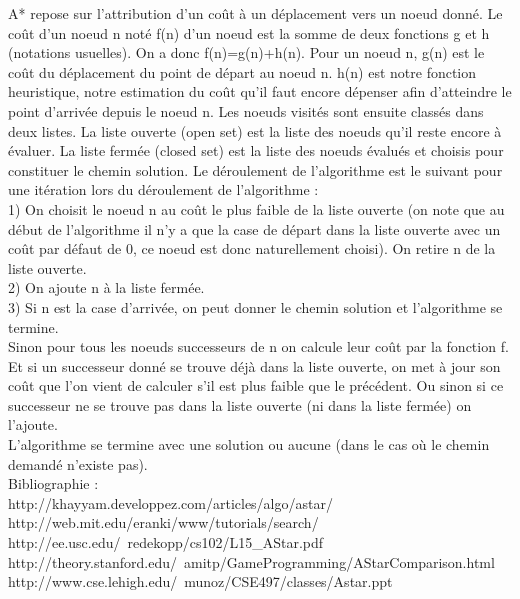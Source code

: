 \documentclass[a4paper,11pt]{article}
\begin{document}
A* repose sur l'attribution d'un coût à un déplacement vers un noeud donné. Le coût d'un noeud n noté f(n) d'un noeud est la somme de deux fonctions g et h (notations usuelles). On a donc f(n)=g(n)+h(n). Pour un noeud n, g(n) est le coût du déplacement du point de départ au noeud n. h(n) est notre fonction heuristique, notre estimation du coût qu'il faut encore dépenser afin d'atteindre le point d'arrivée depuis le noeud n. Les noeuds visités sont ensuite classés dans deux listes. La liste ouverte (open set) est la liste des noeuds qu'il reste encore à évaluer. La liste fermée (closed set) est la liste des noeuds évalués et choisis pour constituer le chemin solution. Le déroulement de l'algorithme est le suivant pour une itération lors du déroulement de l'algorithme : \\
1) On choisit le noeud n au coût le plus faible de la liste ouverte (on note que au début de l'algorithme il n'y a que la case de départ dans la liste ouverte avec un coût par défaut de 0, ce noeud est donc naturellement choisi). On retire n de la liste ouverte. \\
2) On ajoute n à la liste fermée. \\
3) Si n est la case d'arrivée, on peut donner le chemin solution et l'algorithme se termine.\\ 
Sinon pour tous les noeuds successeurs de n on calcule leur coût par la fonction f. Et si un successeur donné se trouve déjà dans la liste ouverte, on met à jour son coût que l'on vient de calculer s'il est plus faible que le précédent. Ou sinon si ce successeur ne se trouve pas dans la liste ouverte (ni dans la liste fermée) on l'ajoute. \\

L'algorithme se termine avec une solution ou aucune (dans le cas où le chemin demandé n'existe pas).\\

Bibliographie :\\

http://khayyam.developpez.com/articles/algo/astar/  \\
http://web.mit.edu/eranki/www/tutorials/search/  \\
http://ee.usc.edu/~redekopp/cs102/L15\_AStar.pdf  \\
http://theory.stanford.edu/~amitp/GameProgramming/AStarComparison.html \\
http://www.cse.lehigh.edu/~munoz/CSE497/classes/Astar.ppt \\
\end{document}
